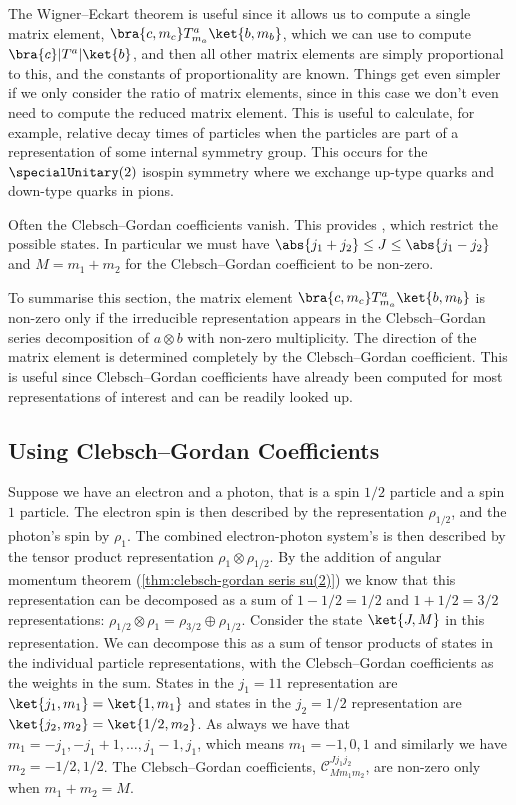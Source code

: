 \documentclass[fleqn]{NotesClass}
\newcommand*{\directsum}{\oplus}
\newcommand*{\directproduct}{\otimes}
\newcommand*{\clebschgordan}[6]{\mathcal{C}_{#1#2#3}^{#4#5#6}}
\begin{document}
    The Wigner--Eckart theorem is useful since it allows us to compute a single matrix element, \(\bra{c, m_c}T_{m_a}^a\ket{b, m_b}\), which we can use to compute \(\bra{c}|T^a|\ket{b}\), and then all other matrix elements are simply proportional to this, and the constants of proportionality are known.
    Things get even simpler if we only consider the ratio of matrix elements, since in this case we don't even need to compute the reduced matrix element.
    This is useful to calculate, for example, relative decay times of particles when the particles are part of a representation of some internal symmetry group.
    This occurs for the \(\specialUnitary(2)\) isospin symmetry where we exchange up-type quarks and down-type quarks in pions.
    
    Often the Clebsch--Gordan coefficients vanish.
    This provides , which restrict the possible states.
    In particular we must have \(\abs{j_1 + j_2} \le J \le \abs{j_1 - j_2}\) and \(M = m_1 + m_2\) for the Clebsch--Gordan coefficient to be non-zero.
    
    To summarise this section, the matrix element \(\bra{c, m_c}T_{m_a}^{a}\ket{b, m_b}\) is non-zero only if the irreducible representation appears in the Clebsch--Gordan series decomposition of \(a \directproduct b\) with non-zero multiplicity.
    The direction of the matrix element is determined completely by the Clebsch--Gordan coefficient.
    This is useful since Clebsch--Gordan coefficients have already been computed for most representations of interest and can be readily looked up.
    
    \subsection{Using Clebsch--Gordan Coefficients}
    Suppose we have an electron and a photon, that is a spin \(1/2\) particle and a spin \(1\) particle.
    The electron spin is then described by the representation \(\rho_{1/2}\), and the photon's spin by \(\rho_{1}\).
    The combined electron-photon system's is then described by the tensor product representation \(\rho_{1} \directproduct \rho_{1/2}\).
    By the addition of angular momentum theorem (\cref{thm:clebsch-gordan seris su(2)}) we know that this representation can be decomposed as a sum of \(1 - 1/2 = 1/2\) and \(1 + 1/2 = 3/2\) representations: \(\rho_{1/2} \directproduct \rho_{1} = \rho_{3/2} \directsum \rho_{1/2}\).
    Consider the state \(\ket{J, M}\) in this representation.
    We can decompose this as a sum of tensor products of states in the individual particle representations, with the Clebsch--Gordan coefficients as the weights in the sum.
    States in the \(j_1 = 11\) representation are \(\ket{j_1, m_1} = \ket{1, m_1}\) and states in the \(j_2 = 1/2\) representation are \(\ket{j_2, m_2} = \ket{1/2, m_2}\).
    As always we have that \(m_1 = -j_1, -j_1 + 1, \dotsc, j_1 - 1, j_1\), which means \(m_1 = -1, 0, 1\) and similarly we have \(m_2 = -1/2, 1/2\).
    The Clebsch--Gordan coefficients, \(\clebschgordan{M}{m_1}{m_2}{J}{j_1}{j_2}\), are non-zero only when \(m_1 + m_2 = M\).
    
\end{document}
